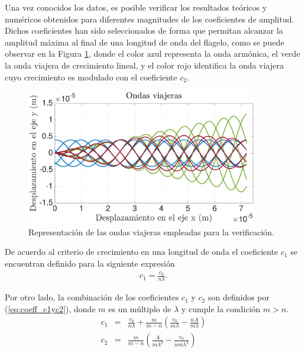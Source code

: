 Una vez conocidos los datos, es posible verificar los resultados teóricos y numéricos obtenidos para diferentes magnitudes de los coeficientes de amplitud. Dichos coeficientes han sido seleccionados de forma que permitan alcanzar la amplitud máxima al final de una longitud de onda del flagelo, como se puede observar en la Figura \ref{fig:OVV}, donde el color azul representa la onda armónica, el verde la onda viajera de crecimiento lineal, y el color rojo identifica la onda viajera cuyo crecimiento es modulado con el coeficiente $c_2$.\\
\begin{figure}[!h] %
	\vspace*{3mm}
    \centering
    \includegraphics[width=0.9\textwidth]{Figuras/OVV}
  	\caption{Representación de las ondas viajeras empleadas para la verificación.}
  	\label{fig:OVV}
\end{figure}

De acuerdo al criterio de crecimiento en una longitud de onda el coeficiente $c_1$ se encuentran definido para la siguiente expresión
\begin{eqnarray}
	\label{eq:coeff_c1}
	c_1 = \frac{c_0}{n\lambda}.
\end{eqnarray}

Por otro lado, la combinación de los coeficientes $c_1$ y $c_2$ son definidos por (\ref{eq:coeff_c1yc2}), donde $m$ es un múltiplo de $\lambda$ y cumple la condición $m > n$.
\begin{eqnarray}
	\label{eq:coeff_c1yc2}
	c_1 &=& \frac{c_0 }{n \lambda} + \frac{m}{m - n}  \left( \frac{c_0} {m  \lambda} - \frac{n A} {m  \lambda} \right)\\
	c_2 &=& \frac{m}{m - n}  \left( \frac{A} {m  \lambda^2} - \frac{c_0} {n m  \lambda^2} \right) \nonumber
\end{eqnarray}

